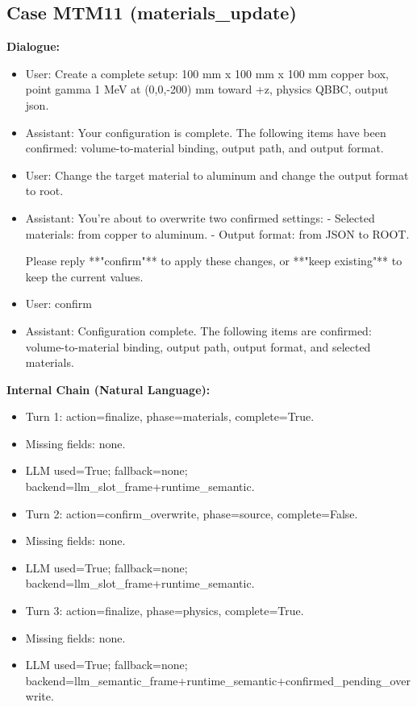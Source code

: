 \documentclass[11pt]{ctexart}
\begin{document}
\subsection{Case MTM11 (materials\_update)}
\textbf{Dialogue:}
\begin{itemize}
\item User: Create a complete setup: 100 mm x 100 mm x 100 mm copper box, point gamma 1 MeV at (0,0,-200) mm toward +z, physics QBBC, output json.
\item Assistant: Your configuration is complete. The following items have been confirmed: volume-to-material binding, output path, and output format.
\item User: Change the target material to aluminum and change the output format to root.
\item Assistant: You're about to overwrite two confirmed settings:
- Selected materials: from copper to aluminum.
- Output format: from JSON to ROOT.

Please reply **"confirm"** to apply these changes, or **"keep existing"** to keep the current values.
\item User: confirm
\item Assistant: Configuration complete. The following items are confirmed: volume-to-material binding, output path, output format, and selected materials.
\end{itemize}
\textbf{Internal Chain (Natural Language):}
\begin{itemize}
\item Turn 1: action=finalize, phase=materials, complete=True.
\item Missing fields: none.
\item LLM used=True; fallback=none; backend=llm\_slot\_frame+runtime\_semantic.
\item Turn 2: action=confirm\_overwrite, phase=source, complete=False.
\item Missing fields: none.
\item LLM used=True; fallback=none; backend=llm\_slot\_frame+runtime\_semantic.
\item Turn 3: action=finalize, phase=physics, complete=True.
\item Missing fields: none.
\item LLM used=True; fallback=none; backend=llm\_semantic\_frame+runtime\_semantic+confirmed\_pending\_overwrite.
\end{itemize}
\end{document}
